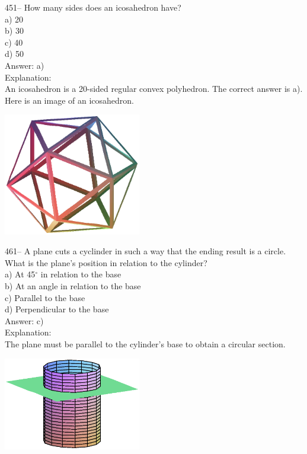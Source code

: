 \documentclass[letterpaper, 12pt]{article}
\begin{document}
451--  How many sides does an icosahedron have?\\
a) 20\\
b) 30\\
c) 40\\
d) 50\\

Answer: a)\\

Explanation: \\
An icosahedron is a 20-sided regular convex polyhedron.
The correct answer is a).
Here is an image of an icosahedron.\\
    \begin{center}
    \includegraphics[width=6cm,bb=0 0 400 400]{icosaedre.eps}
    \end{center}


461-- A plane cuts a cyclinder in such a way that the ending result is a circle.
What is the plane's position in relation to the cylinder?\\

a) At 45$^{\circ}$ in relation to the base\\
b) At an angle in relation to the base\\
c) Parallel to the base\\
d) Perpendicular to the base\\

Answer: c)\\

Explanation: \\
The plane must be parallel to the cylinder's base to obtain a circular section.
    \begin{center}
    \includegraphics[width=6cm,bb=0 0 400 400]{cylplanhor.eps}
    \end{center}
\end{document}
